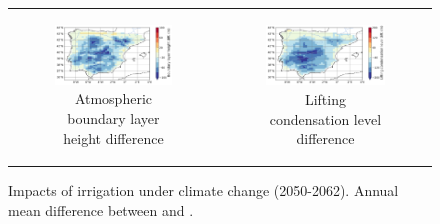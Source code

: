 \begin{figure}[htbp]
\begin{tabular}{cc}
        \begin{subfigure}[b]{0.5\textwidth}
            \caption{Atmospheric boundary layer height difference}
            \includegraphics[width=\textwidth]{images/chap4/future/diffmap_s_pblh_futirr.png}
        \end{subfigure} &
        \begin{subfigure}[b]{0.5\textwidth}
            \caption{Lifting condensation level difference}
            \includegraphics[width=\textwidth]{images/chap4/future/diffmap_s_lcl_futirr.png}
        \end{subfigure} \\
    \end{tabular}
    \caption{Impacts of irrigation under climate change (2050-2062). Annual mean difference between \futirr and \futnoirr.}
    \label{fig:diffmaps_future_irr}
\end{figure}


